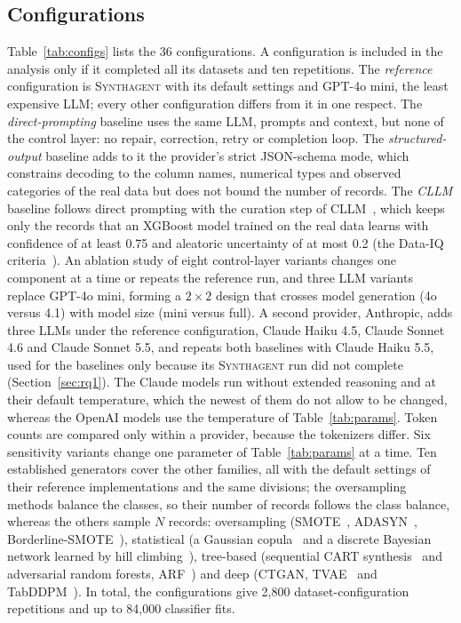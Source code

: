 \documentclass[conference]{IEEEtran}
\newcommand{\system}{\textsc{Synthagent}\xspace}
\begin{document}
\subsection{Configurations}
Table~\ref{tab:configs} lists the 36 configurations. A configuration is included in the analysis only if it completed all its datasets and ten repetitions. The \emph{reference} configuration is \system with its default settings and GPT-4o mini, the least expensive LLM; every other configuration differs from it in one respect. The \emph{direct-prompting} baseline uses the same LLM, prompts and context, but none of the control layer: no repair, correction, retry or completion loop. The \emph{structured-output} baseline adds to it the provider's strict JSON-schema mode, which constrains decoding to the column names, numerical types and observed categories of the real data but does not bound the number of records. The \emph{CLLM} baseline follows direct prompting with the curation step of CLLM~\cite{seedat2024cllm}, which keeps only the records that an XGBoost model trained on the real data learns with confidence of at least 0.75 and aleatoric uncertainty of at most 0.2 (the Data-IQ criteria~\cite{seedat2022dataiq}). An ablation study of eight control-layer variants changes one component at a time or repeats the reference run, and three LLM variants replace GPT-4o mini, forming a $2\times2$ design that crosses model generation (4o versus 4.1) with model size (mini versus full). A second provider, Anthropic, adds three LLMs under the reference configuration, Claude Haiku 4.5, Claude Sonnet 4.6 and Claude Sonnet 5.5, and repeats both baselines with Claude Haiku 5.5, used for the baselines only because its \system run did not complete (Section~\ref{sec:rq1}). The Claude models run without extended reasoning and at their default temperature, which the newest of them do not allow to be changed, whereas the OpenAI models use the temperature of Table~\ref{tab:params}. Token counts are compared only within a provider, because the tokenizers differ. Six sensitivity variants change one parameter of Table~\ref{tab:params} at a time. Ten established generators cover the other families, all with the default settings of their reference implementations and the same divisions; the oversampling methods balance the classes, so their number of records follows the class balance, whereas the others sample $N$ records: oversampling (SMOTE~\cite{chawla2002smote}, ADASYN~\cite{he2008adasyn}, Borderline-SMOTE~\cite{han2005borderline}), statistical (a Gaussian copula~\cite{patki2016sdv} and a discrete Bayesian network learned by hill climbing~\cite{zhang2014privbayes}), tree-based (sequential CART synthesis~\cite{nowok2016synthpop} and adversarial random forests, ARF~\cite{watson2023arf}) and deep (CTGAN, TVAE~\cite{xu2019ctgan} and TabDDPM~\cite{kotelnikov2023tabddpm}). In total, the configurations give 2,800 dataset-configuration repetitions and up to 84,000 classifier fits.
\end{document}
